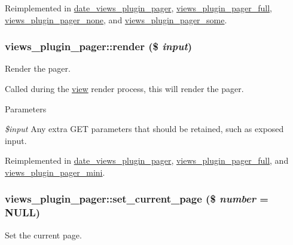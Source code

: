 Reimplemented in \hyperlink{classdate__views__plugin__pager_a59ac4b003dc6526dea57ec530266274b}{date\_\-views\_\-plugin\_\-pager}, \hyperlink{classviews__plugin__pager__full_a97cf3d3a2a632da5a5efbea9b344b236}{views\_\-plugin\_\-pager\_\-full}, \hyperlink{classviews__plugin__pager__none_a16102d30cc1402cb7ed28fba9606cf81}{views\_\-plugin\_\-pager\_\-none}, and \hyperlink{classviews__plugin__pager__some_a47c807d686e60481be1e6289e3672860}{views\_\-plugin\_\-pager\_\-some}.\hypertarget{classviews__plugin__pager_abfc50728fdc63bfe94bcd242d39deb1e}{
\subsubsection[{render}]{\setlength{\rightskip}{0pt plus 5cm}views\_\-plugin\_\-pager::render (\$ {\em input})}}
\label{classviews__plugin__pager_abfc50728fdc63bfe94bcd242d39deb1e}
Render the pager.

Called during the \hyperlink{classview}{view} render process, this will render the pager.


\begin{DoxyParams}{Parameters}
\item[{\em \$input}]Any extra GET parameters that should be retained, such as exposed input. \end{DoxyParams}


Reimplemented in \hyperlink{classdate__views__plugin__pager_a607a0d8a316a4b74f85205f35a59ce5a}{date\_\-views\_\-plugin\_\-pager}, \hyperlink{classviews__plugin__pager__full_a1832939d6ea8c80e643cb94bae96daf8}{views\_\-plugin\_\-pager\_\-full}, and \hyperlink{classviews__plugin__pager__mini_a71a931670147e0b4356b3a0133104933}{views\_\-plugin\_\-pager\_\-mini}.\hypertarget{classviews__plugin__pager_ab79949456c53589c17ca262732aabf4b}{
\subsubsection[{set\_\-current\_\-page}]{\setlength{\rightskip}{0pt plus 5cm}views\_\-plugin\_\-pager::set\_\-current\_\-page (\$ {\em number} = {\ttfamily NULL})}}
\label{classviews__plugin__pager_ab79949456c53589c17ca262732aabf4b}
Set the current page.


